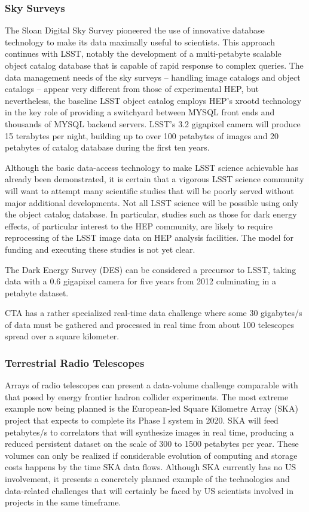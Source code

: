 \subsubsection{Sky Surveys}
The Sloan Digital Sky Survey pioneered the use of innovative database technology to make 
its data maximally useful to scientists.  This approach continues with LSST, notably the 
development of a multi-petabyte scalable object catalog database that is capable of rapid 
response to complex queries.  The data management needs of the sky surveys -- handling image 
catalogs and object catalogs -- appear very different from those of experimental HEP, but 
nevertheless, the baseline LSST object catalog employs HEP's xrootd technology in the key 
role of providing a switchyard between MYSQL front ends and thousands of MYSQL backend servers.  
LSST's 3.2 gigapixel camera will produce 15 terabytes per night, building up to over 100 
petabytes of images and 20 petabytes of catalog database during the first ten years.

Although the basic data-access technology to make LSST science achievable has already been 
demonstrated, it is certain that a vigorous LSST science community will want to attempt many 
scientific studies that will be poorly served without major additional developments.  
Not all LSST science will be possible using only the object catalog database. In particular, 
studies such as those for dark energy effects, of particular interest to the HEP community, 
are likely to require reprocessing of the LSST image data on HEP analysis facilities.  
The model for funding and executing these studies is not yet clear.

The Dark Energy Survey (DES) can be considered a precursor to LSST, taking data with a 
0.6 gigapixel camera for five years from 2012 culminating in a petabyte dataset.

CTA has a rather specialized real-time data challenge where some 30 gigabytes/s of data 
must be gathered and processed in real time from about 100 telescopes spread over a square kilometer.


\subsubsection{Terrestrial Radio Telescopes}
Arrays of radio telescopes can present a data-volume challenge comparable with that 
posed by energy frontier hadron collider experiments.  The most extreme example now being 
planned is the European-led Square Kilometre Array (SKA) project that expects to complete 
its Phase I system in 2020. SKA will feed petabytes/s to correlators that will synthesize 
images in real time, producing a reduced persistent dataset on the scale of 300 to 1500 
petabytes per year.  These volumes can only be realized if considerable evolution of 
computing and storage costs happens by the time SKA data flows.  Although SKA currently 
has no US involvement, it presents a concretely planned example of the technologies and 
data-related challenges that will certainly be faced by US scientists involved in projects 
in the same timeframe.

